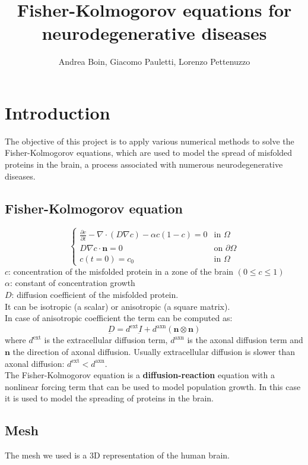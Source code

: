 \documentclass[12pt, letterpaper]{article}
\title{Fisher-Kolmogorov equations for neurodegenerative diseases}
\author{Andrea Boin, Giacomo Pauletti, Lorenzo Pettenuzzo}
\date{}
\begin{document}
\maketitle
\pagebreak

\tableofcontents
\pagebreak

\section{Introduction}
The objective of this project is to apply various numerical methods to solve the Fisher-Kolmogorov equations, which are used to model the spread of misfolded proteins in the brain, a process associated with numerous neurodegenerative diseases.

\subsection{Fisher-Kolmogorov equation}
\[
\begin{cases}
\displaystyle \frac{\partial c}{\partial t} - \nabla \cdot (D \nabla c) - \alpha c(1 - c) = 0 & \text{in } \Omega\\
\displaystyle D \nabla c \cdot \mathbf{n} = 0 & \text{on } \partial \Omega\\
c(t=0)=c_0 & \text{in } \Omega
\end{cases}
\]
$c$: concentration of the misfolded protein in a zone of the brain $(0\leq c\leq1)$\\
$\alpha$: constant of concentration growth\\
$D$: diffusion coefficient of the misfolded protein.\\
It can be isotropic (a scalar) or anisotropic (a square matrix).\\
In case of anisotropic coefficient the term can be computed as:
$$\underbar{D}=d^{\text{ext}}\underbar{I}+d^{\text{axn}}(\mathbf{n}\otimes\mathbf{n})$$
where $d^{\text{ext}}$ is the extracellular diffusion term, $d^{\text{axn}}$ is the axonal diffusion term and $\mathbf{n}$ the direction of axonal diffusion. Usually extracellular diffusion is slower than axonal diffusion: $d^{\text{ext}}<d^{\text{axn}}$.\\

The Fisher-Kolmogorov equation is a \textbf{diffusion-reaction} equation with a nonlinear forcing term that can be used to model population growth. In this case it is used to model the spreading of proteins in the brain. 

\subsection{Mesh}
The mesh we used is a 3D representation of the human brain.
\pagebreak
\end{document}
